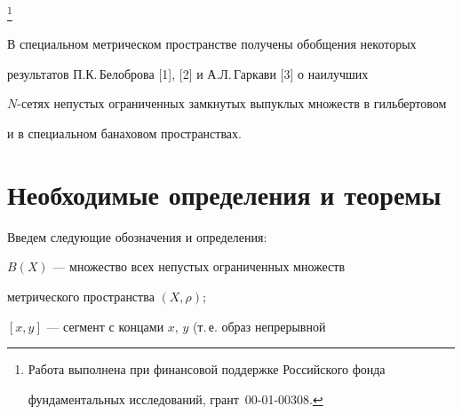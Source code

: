 \thanks{Работа выполнена при финансовой поддержке Российского фонда 


фундаментальных исследований, грант \No\,00-01-00308.}





\date{}




\pagestyle{plain} %







\maketitle


\label{begin}














В специальном метрическом пространстве получены обобщения некоторых 


результатов П.К.\,Белоброва [1], [2] и А.Л.\,Гаркави [3] о наилучших


$N$-сетях непустых ограниченных замкнутых выпуклых множеств в гильбертовом 


и в специальном банаховом пространствах. 








\section{Необходимые определения и теоремы}








Введем следующие обозначения и определения:





$B(X)$ --- множество всех непустых ограниченных множеств 


метрического пространства $(X,\rho)$;





$[x, y]$ --- сегмент с концами $x$, $y$ (т.\,е. образ непрерывной 


